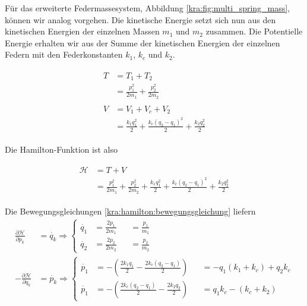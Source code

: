 Für das erweiterte Federmassesystem, Abbildung \ref{kra:fig:multi_spring_mass}, können wir analog vorgehen.
Die kinetische Energie setzt sich nun aus den kinetischen Energien der einzelnen Massen $m_1$ und $m_2$ zusammen.
Die Potentielle Energie erhalten wir aus der Summe der kinetischen Energien der einzelnen Federn mit den Federkonstanten $k_1$, $k_c$ und $k_2$.

\begin{align*}
    \begin{split}
        T   &= T_1 + T_2 \\
        &= \frac{p_1^2}{2m_1} + \frac{p_2^2}{2m_2}
    \end{split}
    \\
    \begin{split}
        V   &= V_1 + V_c + V_2 \\
        &= \frac{k_1 q_1^2}{2} + \frac{k_c (q_2 - q_1)^2}{2} + \frac{k_2 q_2^2}{2}
    \end{split}
\end{align*}

Die Hamilton-Funktion ist also

\begin{align*}
    \begin{split}
        \mathcal{H}     &= T + V \\
        &= \frac{p_1^2}{2m_1} + \frac{p_2^2}{2m_2} + \frac{k_1 q_1^2}{2} + \frac{k_c (q_2 - q_1)^2}{2} + \frac{k_2 q_2^2}{2}
    \end{split}
\end{align*}

Die Bewegungsgleichungen \ref{kra:hamilton:bewegungsgleichung} liefern
\begin{align*}
    \frac{\partial \mathcal{H}}{\partial p_k}  & = \dot{q_k}
    \Rightarrow
    \left\{
    \begin{alignedat}{2}
        \dot{q_1}   &= \frac{2p_1}{2m_1}    &&= \frac{p_1}{m_1}\\
        \dot{q_2}   &= \frac{2p_2}{2m_2}    &&= \frac{p_2}{m_2}
    \end{alignedat}
    \right.
    \\
    -\frac{\partial \mathcal{H}}{\partial q_k} & = \dot{p_k}
    \Rightarrow
    \left\{
    \begin{alignedat}{2}
        \dot{p_1}   &= -(\frac{2k_1q_1}{2} - \frac{2k_c(q_2-q_1)}{2})  &&= -q_1(k_1+k_c) + q_2k_c \\
        \dot{p_1}   &= -(\frac{2k_c(q_2-q_1)}{2} - \frac{2k_2q_2}{2})  &&= q_1k_c - (k_c + k_2)
    \end{alignedat}
    \right.
\end{align*}

